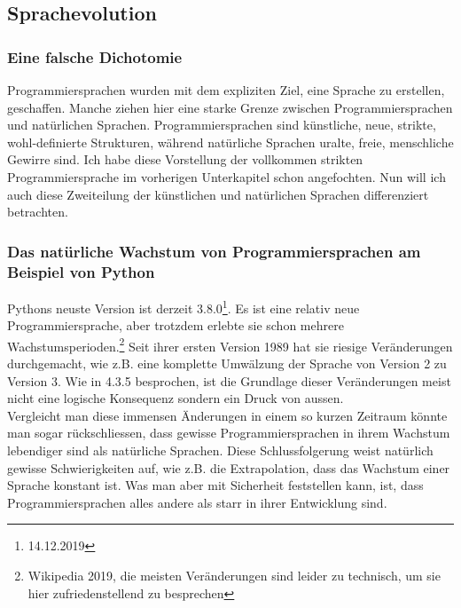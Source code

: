 \documentclass[10pt,a4paper]{article}
\begin{document}
\subsection{Sprachevolution}

\subsubsection{Eine falsche Dichotomie}
Programmiersprachen wurden mit dem expliziten Ziel, eine Sprache zu erstellen, geschaffen. Manche ziehen hier eine starke Grenze zwischen Programmiersprachen und natürlichen Sprachen. Programmiersprachen sind künstliche, neue, strikte, wohl-definierte Strukturen, während natürliche Sprachen uralte, freie, menschliche Gewirre sind.
Ich habe diese Vorstellung der vollkommen strikten Programmiersprache im vorherigen Unterkapitel schon angefochten. Nun will ich auch diese Zweiteilung der künstlichen und natürlichen Sprachen differenziert betrachten.

\subsubsection{Das natürliche Wachstum von Programmiersprachen am Beispiel von Python}
Pythons neuste Version ist derzeit 3.8.0\footnote{14.12.2019}. Es ist eine relativ neue Programmiersprache, aber trotzdem erlebte sie schon mehrere Wachstumsperioden.\footnote{Wikipedia 2019, die meisten Veränderungen sind leider zu technisch, um sie hier zufriedenstellend zu besprechen} Seit ihrer ersten Version 1989 hat sie riesige Veränderungen durchgemacht, wie z.B. eine komplette Umwälzung der Sprache von Version 2 zu Version 3. Wie in 4.3.5 besprochen, ist die Grundlage dieser Veränderungen meist nicht eine logische Konsequenz sondern ein Druck von aussen. \\
Vergleicht man diese immensen Änderungen in einem so kurzen Zeitraum könnte man sogar rückschliessen, dass gewisse Programmiersprachen in ihrem Wachstum lebendiger sind als natürliche Sprachen. Diese Schlussfolgerung weist natürlich gewisse Schwierigkeiten auf, wie z.B. die Extrapolation, dass das Wachstum einer Sprache konstant ist. Was man aber mit Sicherheit feststellen kann, ist, dass Programmiersprachen alles andere als starr in ihrer Entwicklung sind.
\end{document}

